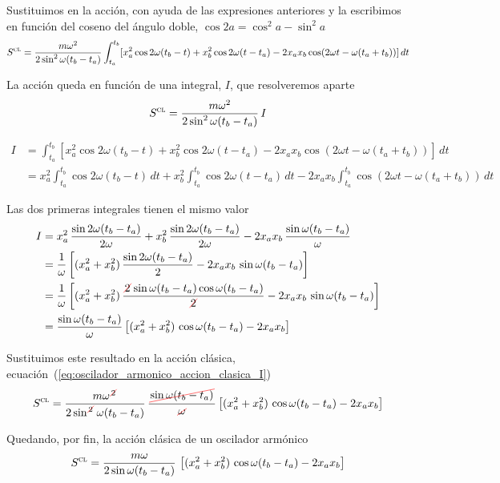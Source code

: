  Sustituimos en la acción, con ayuda de las expresiones anteriores y
 la escribimos en función del coseno del ángulo doble,
 $\cos 2a = \cos^2a-\sin^2a$
 {\small
 \[
    S^{\textsc{cl}}
    =
      \dfrac{m\omega^2}{2\sin^2\omega(t_b-t_a)}\int_{t_a}^{t_b}
      [x_a^2\cos 2\omega(t_b-t) + x_b^2\cos 2\omega(t-t_a)
      -2x_ax_b\cos(2\omega t-\omega(t_a+t_b))]\,dt
 \]
}

La acción queda en función de una integral, $I$, que resolveremos
aparte
\begin{equation}\label{eq:oscilador_armonico_accion_clasica_I}
  S^{\textsc{cl}} = \dfrac{m\omega^2}{2\sin^2\omega(t_b-t_a)}\,I
\end{equation}

{\small
\begin{align*}
 I
  &=
    \int_{t_a}^{t_b}
    [x_a^2\cos 2\omega(t_b-t) + x_b^2\cos 2\omega(t-t_a)
    -2x_ax_b\cos(2\omega t-\omega(t_a+t_b))]\,dt\\
  &=
    x_a^2\int_{t_a}^{t_b}\cos 2\omega(t_b-t)\,dt
    + x_b^2\int_{t_a}^{t_b}\cos 2\omega(t-t_a)\,dt
    -2x_ax_b\int_{t_a}^{t_b}\cos(2\omega t-\omega(t_a+t_b))\,dt
\end{align*}
}

Las dos primeras integrales tienen el mismo valor
\begin{align*}
  I
  &=
    x_a^2\,\dfrac{\sin 2\omega(t_b-t_a)}{2\omega}
    + x_b^2\,\dfrac{\sin 2\omega(t_b-t_a)}{2\omega}
    - 2x_ax_b\,\dfrac{\sin\omega(t_b-t_a)}{\omega}\\
  &=
    \dfrac{1}{\omega} \left[(x_a^2+x_b^2)\,\dfrac{\sin 2\omega(t_b-t_a)}{2}
    - 2x_ax_b\,\sin\omega(t_b-t_a)\right]\\
  &=
    \dfrac{1}{\omega} \left[(x_a^2+x_b^2)\,\dfrac{\cancelout{2}\sin\omega(t_b-t_a) \cos\omega(t_b-t_a)}{\cancelout{2}}
    - 2x_ax_b\,\sin\omega(t_b-t_a)\right]\\
  &=
    \dfrac{\sin\omega(t_b-t_a)}{\omega}
    \left[(x_a^2+x_b^2)\,\cos\omega(t_b-t_a) - 2x_ax_b\right]
\end{align*}

Sustituimos este resultado en la acción clásica,
ecuación~(\ref{eq:oscilador_armonico_accion_clasica_I})
\[
  S^{\textsc{cl}}
  =
  \dfrac{m\omega^{\cancelout{\scriptstyle 2}}}
  {2\sin^{\cancelout{\scriptstyle 2}}\omega(t_b-t_a)}\,
    \dfrac{\cancelout{\sin\omega(t_b-t_a)}}{\cancelout{\omega}}
    \left[(x_a^2+x_b^2)\,\cos\omega(t_b-t_a) - 2x_ax_b\right]
\]

Quedando, por fin, la acción clásica de un oscilador armónico
\begin{equation}\label{eq:oscilador_armonico_accion_clasica}
  S^{\textsc{cl}}
  =
  \dfrac{m\omega}
  {2\sin\omega(t_b-t_a)}\,
  \left[(x_a^2+x_b^2)\,\cos\omega(t_b-t_a) - 2x_ax_b\right]
\end{equation}

